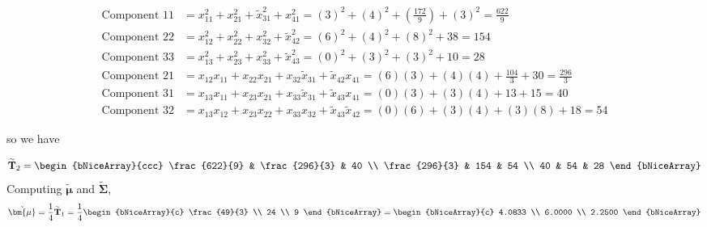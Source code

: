     \begin{align*}
        \scriptstyle \text{Component 11} &= \scriptstyle  x_{11}^{2} + x_{21}^{2} + \widetilde{x}_{31}^{2} + x_{41}^{2} = {(3)}^{2} + {(4)}^{2} + \left(\frac{172}{9}\right) + {(3)}^{2} = \frac{622}{9} \\
        \scriptstyle \text{Component 22} &= \scriptstyle  x_{12}^{2} + x_{22}^{2} + x_{32}^{2} + \widetilde{x}_{42}^{2} = {(6)}^{2} + {(4)}^{2} + {(8)}^{2} + 38 = 154 \\
        \scriptstyle  \text{Component 33} &= \scriptstyle  x_{13}^{2} + x_{23}^{2} + x_{33}^{2} + \widetilde{x}_{43}^{2} = {(0)}^{2} + {(3)}^{2} + {(3)}^{2} + 10 = 28 \\
        \scriptstyle  \text{Component 21} &= \scriptstyle  x_{12}x_{11} + x_{22}x_{21} + x_{32}\widetilde{x}_{31} + \widetilde{x}_{42}x_{41} = (6)(3) + (4)(4) + \frac{104}{3} + 30 = \frac{296}{3} \\
        \scriptstyle  \text{Component 31} &= \scriptstyle  x_{13}x_{11} + x_{23}x_{21} + x_{33}\widetilde{x}_{31} + \widetilde{x}_{43}x_{41} = (0)(3) + (3)(4) + 13 + 15 = 40 \\
        \scriptstyle  \text{Component 32} &= \scriptstyle  x_{13}x_{12} + x_{23}x_{22} + x_{33}x_{32} + \widetilde{x}_{43}\widetilde{x}_{42} = (0)(6) + (3)(4) + (3)(8) + 18 = 54
    \end{align*}

so we have

\[
    \widetilde{\textbf{T}}_{2}
    =
    \begin{bNiceArray}{ccc}
        \frac{622}{9} & \frac{296}{3} & 40 \\
        \frac{296}{3} & 154           & 54 \\
        40            & 54            & 28
    \end{bNiceArray}
\]
Computing $\widetilde{\bm{\mu}}$ and $\widetilde{\bm{\Sigma}}$,
\[
    \tilde{\bm{\mu}}
    =
    \frac{1}{4}
    \widetilde{\textbf{T}}_{1}
    =
    \frac{1}{4}
    \begin{bNiceArray}{c}
        \frac{49}{3} \\
        24 \\
        9
    \end{bNiceArray}
    =
    \begin{bNiceArray}{c}
        4.0833 \\
        6.0000 \\
        2.2500
    \end{bNiceArray}
\]

